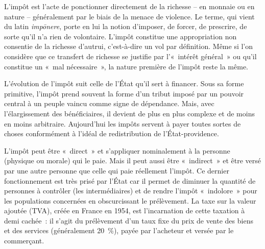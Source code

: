 L'impôt est l'acte de ponctionner directement de la richesse -- en monnaie ou en nature -- généralement par le biais de la menace de violence. Le terme, qui vient du latin \emph{impōnere}, porte en lui la notion d'imposer, de forcer, de prescrire, de sorte qu'il n'a rien de volontaire. L'impôt constitue une appropriation non consentie de la richesse d'autrui, c'est-à-dire un vol par définition. Même si l'on considère que ce transfert de richesse se justifie par l'«~intérêt général~» ou qu'il constitue un «~mal nécessaire~», la nature première de l'impôt reste la même.

L'évolution de l'impôt suit celle de l'État qu'il sert à financer. Sous sa forme primitive, l'impôt prend souvent la forme d'un tribut imposé par un pouvoir central à un peuple vaincu comme signe de dépendance. Mais, avec l'élargissement des bénéficiaires, il devient de plus en plus complexe et de moins en moins arbitraire. Aujourd'hui les impôts servent à payer toutes sortes de choses conformément à l'idéal de redistribution de l'État-providence. %

L'impôt peut être «~direct~» et s'appliquer nominalement à la personne (physique ou morale) qui le paie. Mais il peut aussi être «~indirect~» et être versé par une autre personne que celle qui paie réellement l'impôt. Ce dernier fonctionnement est très prisé par l'État car il permet de diminuer la quantité de personnes à contrôler (les intermédiaires) et de rendre l'impôt «~indolore~» pour les populations concernées en obscurcissant le prélèvement. La taxe sur la valeur ajoutée (TVA), créée en France en 1954, est l'incarnation de cette taxation à demi cachée~: il s'agit du prélèvement d'un taux fixe du prix de vente des biens et des services (généralement 20~\%), payée par l'acheteur et versée par le commerçant. %

